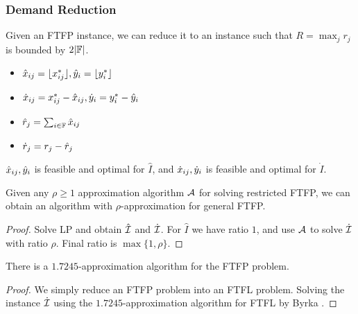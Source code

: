 \documentclass[hyperref, xcolor=dvipsnames]{beamer}
\begin{document}
\begin{frame}
  \frametitle{Demand Reduction} Given an FTFP instance, we can reduce
  it to an instance such that $R=\max_{j}r_j$ is bounded by
  $2|\mathbb{F}|$.

  \begin{itemize}
    \item ${\hat x}_{ij} = { \lfloor x_{ij}^\ast \rfloor }, {\hat y}_{i} = { \lfloor y_i^\ast \rfloor }$
    \item ${\dot x}_{ij} = x_{ij}^\ast - {\hat x}_{ij}, {\dot y}_{i} = y_i^\ast
      - {\hat y}_{i}$
    \item ${\hat r}_j = \sum_{i\in\mathbb{F}} {\hat x}_{ij}$
    \item ${\dot r}_j = r_j - {\hat r}_j$
  \end{itemize}
  
  \begin{claim}
    ${\hat x}_{ij}, {\hat y}_{i}$ is feasible and optimal for $\hat I$, and
    ${\dot x}_{ij}, {\dot y}_{i}$ is feasible and optimal for $\dot I$.
  \end{claim}
\end{frame}

\begin{frame}
  \begin{theorem}
    Given any $\rho\geq 1$ approximation algorithm ${\cal A}$ for solving
    restricted FTFP, we can obtain an algorithm with
    $\rho$-approximation for general FTFP.
  \end{theorem}
  \begin{proof}
    Solve LP and obtain $\hat {\mathcal{I}}$ and $\dot {\mathcal{I}}$. For $\hat I$ we have
    ratio $1$, and use ${\cal A}$ to solve $\dot {\mathcal{I}}$ with ratio
    $\rho$. Final ratio is $\max\{1,\rho\}$.
  \end{proof}
\end{frame}

\begin{frame}
  \begin{corollary}
    There is a $1.7245$-approximation algorithm for the FTFP problem.
  \end{corollary}
  \begin{proof}
    We simply reduce an FTFP problem into an FTFL problem. Solving the
    instance $\dot {\mathcal{I}}$ using the $1.7245$-approximation algorithm
    for FTFL by Byrka {\etal}.
  \end{proof}
\end{frame}
\end{document}
